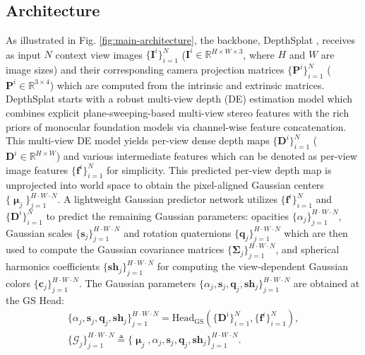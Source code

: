 \documentclass[runningheads]{llncs}
\begin{document}
\subsection{Architecture}
\label{sec:backbone}
As illustrated in Fig. \ref{fig:main-architecture}, the backbone, DepthSplat \cite{xu2025depthsplat}, receives as input $N$ context view images $\{\mathbf{I}^i\}_{i=1}^N$ ($\mathbf{I}^i\in\mathbb{R}^{H\times W\times 3}$, where $H$ and $W$ are image sizes) and their corresponding camera projection matrices $\{\mathbf{P}^i\}_{i=1}^N$ ($\mathbf{P}^i\in\mathbb{R}^{3\times4}$) which are computed from the intrinsic and extrinsic matrices.
DepthSplat \cite{xu2025depthsplat} starts with a robust multi-view depth (DE) estimation model which combines explicit plane-sweeping-based multi-view stereo features \cite{xu2023unifying, chen2024mvsplat} with the rich priors of monocular foundation models \cite{yang2024depth} via channel-wise feature concatenation. This multi-view DE model yields per-view dense depth maps $\{\mathbf{D}^i\}_{i=1}^N$ ($\mathbf{D}^i\in\mathbb{R}^{H\times W}$) and various intermediate features which can be denoted as per-view image features $\{\mathbf{f}^i\}_{i=1}^N$ for simplicity.
This predicted per-view depth map is unprojected into world space to obtain the pixel-aligned Gaussian centers $\{\bm{\upmu}_j\}_{j=1}^{H\cdot W\cdot N}$. A lightweight Gaussian predictor network utilizes $\{\mathbf{f}^i\}_{i=1}^N$ and $\{\mathbf{D}^i\}_{i=1}^N$ to predict the remaining Gaussian parameters: opacities $\{\alpha_j\}_{j=1}^{H\cdot W\cdot N}$, Gaussian scales $\{\mathbf{s}_j\}_{j=1}^{H\cdot W\cdot N}$ and rotation quaternions $\{\mathbf{q}_j\}_{j=1}^{H\cdot W\cdot N}$ which are then used to compute the Gaussian covariance matrices $\{\mathbf{\Sigma}_j\}_{j=1}^{H\cdot W\cdot N}$, and spherical harmonics coefficients $\{\mathbf{sh}_j\}_{j=1}^{H\cdot W\cdot N}$ for computing the view-dependent Gaussian colors $\{\mathbf{c}_j\}_{j=1}^{H\cdot W\cdot N}$. The Gaussian parameters $\{\alpha_j,\mathbf{s}_j,\mathbf{q}_j,\mathbf{sh}_j\}_{j=1}^{H\cdot W\cdot N}$ are obtained at the GS Head:
\begin{equation}
  \begin{split}
  \{\alpha_j,\mathbf{s}_j,\mathbf{q}_j,\mathbf{sh}_j\}_{j=1}^{H\cdot W\cdot N}
  = \text{Head}_\text{GS}(\{\mathbf{D}^i\}_{i=1}^N,\{\mathbf{f}^i\}_{i=1}^N), \\
  \{\mathcal{G}_j\}_{j=1}^{H\cdot W\cdot N}\triangleq\{\bm{\upmu}_j,\alpha_j,\mathbf{s}_j,\mathbf{q}_j,\mathbf{sh}_j\}_{j=1}^{H\cdot W\cdot N}.
  \end{split}
  \label{eq:gs_head}
\end{equation}
\end{document}
